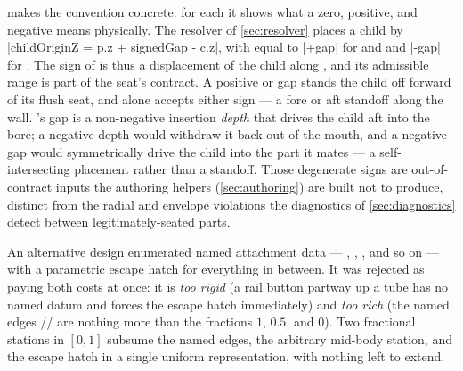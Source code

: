  makes the  convention concrete: for each  it shows
what a zero, positive, and negative  means physically. The resolver of \cref{sec:resolver}
places a child by \cppinline|childOriginZ = p.z + signedGap - c.z|, with  equal to
\cppinline|+gap| for  and  and \cppinline|-gap| for . The
sign of  is thus a displacement of the child along \zfwd, and its admissible range is part
of the seat's contract. A positive  or  gap stands the child off forward
of its flush seat, and  alone accepts either sign --- a fore or aft standoff along
the wall. 's gap is a non-negative insertion \emph{depth} that drives the child aft
into the bore; a negative depth would withdraw it back out of the mouth, and a negative 
gap would symmetrically drive the child into the part it mates --- a self-intersecting placement
rather than a standoff. Those degenerate signs are out-of-contract inputs the authoring helpers
(\cref{sec:authoring}) are built not to produce, distinct from the radial and envelope violations the
diagnostics of \cref{sec:diagnostics} detect between legitimately-seated parts.


\begin{rejected}
An alternative design enumerated named attachment data --- , , , and
so on --- with a parametric escape hatch for everything in between. It was rejected as paying both
costs at once: it is \emph{too rigid} (a rail button partway up a tube has no named datum and forces
the escape hatch immediately) and \emph{too rich} (the named edges //
are nothing more than the fractions $1$, $0.5$, and $0$). Two fractional stations in $[0,1]$ subsume
the named edges, the arbitrary mid-body station, and the escape hatch in a single uniform
representation, with nothing left to extend.
\end{rejected}

